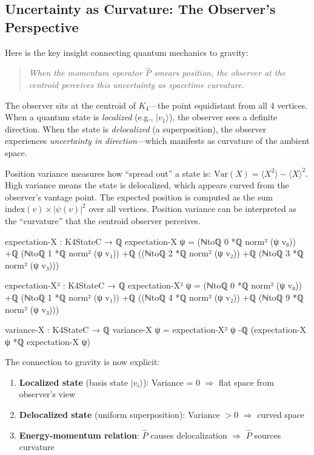 \documentclass[11pt,a4paper]{book}
\begin{document}
\subsection{Uncertainty as Curvature: The Observer's Perspective}

Here is the key insight connecting quantum mechanics to gravity:
\begin{quote}
\emph{When the momentum operator $\hat{P}$ smears position, the observer at the centroid perceives 
this uncertainty as spacetime curvature.}
\end{quote}

The observer sits at the centroid of $K_4$---the point equidistant from all 4 vertices.
When a quantum state is \emph{localized} (e.g., $|v_1\rangle$), the observer
sees a definite direction. When the state is \emph{delocalized} (a superposition),
the observer experiences \emph{uncertainty in direction}---which manifests as
curvature of the ambient space.

Position variance measures how ``spread out'' a state is: $\text{Var}(X) = \langle X^2\rangle - \langle X\rangle^2$. High variance means the state is delocalized, which appears curved from the observer's vantage point. The expected position is computed as the sum $\text{index}(v) \times |\psi(v)|^2$ over all vertices. Position variance can be interpreted as the ``curvature'' that the centroid observer perceives.

\begin{code}
expectation-X : K4StateC → ℚ
expectation-X ψ = (ℕtoℚ 0 *ℚ norm² (ψ v₀)) +ℚ (ℕtoℚ 1 *ℚ norm² (ψ v₁))
              +ℚ ((ℕtoℚ 2 *ℚ norm² (ψ v₂)) +ℚ (ℕtoℚ 3 *ℚ norm² (ψ v₃)))

expectation-X² : K4StateC → ℚ
expectation-X² ψ = (ℕtoℚ 0 *ℚ norm² (ψ v₀)) +ℚ (ℕtoℚ 1 *ℚ norm² (ψ v₁))
               +ℚ ((ℕtoℚ 4 *ℚ norm² (ψ v₂)) +ℚ (ℕtoℚ 9 *ℚ norm² (ψ v₃)))

variance-X : K4StateC → ℚ
variance-X ψ = expectation-X² ψ -ℚ (expectation-X ψ *ℚ expectation-X ψ)
\end{code}

The connection to gravity is now explicit:

\begin{enumerate}
\item \textbf{Localized state} (basis state $|v_i\rangle$): 
      Variance = 0 $\Rightarrow$ flat space from observer's view
\item \textbf{Delocalized state} (uniform superposition): 
      Variance $> 0$ $\Rightarrow$ curved space
\item \textbf{Energy-momentum relation}: 
      $\hat{P}$ causes delocalization $\Rightarrow$ $\hat{P}$ sources curvature
\end{enumerate}
\end{document}
